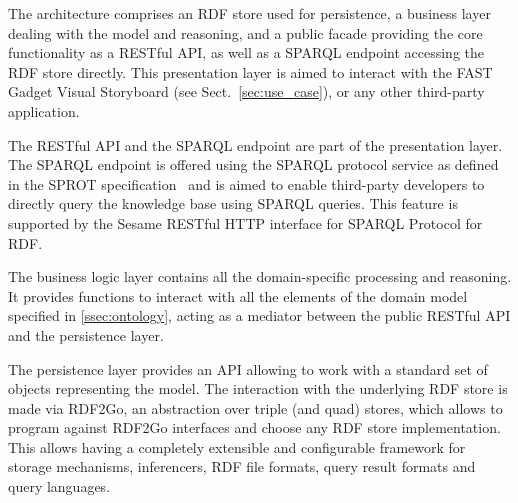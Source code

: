 The architecture comprises an RDF store used for persistence, a business layer dealing with the model and reasoning, and a public facade providing the core functionality as a RESTful API, as well as a SPARQL endpoint accessing the RDF store directly. This presentation layer is aimed to interact with the FAST Gadget Visual Storyboard (see Sect.~\ref{sec:use_case}), or any other third-party application.

The RESTful API and the SPARQL endpoint are part of the presentation layer. The SPARQL endpoint is offered using the SPARQL protocol service as defined in the SPROT specification~\cite{sprot} and is aimed to enable third-party developers to directly query the knowledge base using SPARQL queries. This feature is supported by the Sesame RESTful HTTP interface for SPARQL Protocol for RDF.

The business logic layer contains all the domain-specific processing and reasoning. It provides functions to interact with all the elements of the domain model specified in \ref{ssec:ontology},
acting as a mediator between the public RESTful API and the persistence layer.

The persistence layer provides an API allowing to work with a standard set of objects representing the model. The interaction with the underlying RDF store is made via RDF2Go, an abstraction over triple (and quad) stores, which allows to program against RDF2Go interfaces and choose any RDF store implementation. This allows having a completely extensible and configurable framework for storage mechanisms, inferencers, RDF file formats, query result formats and query languages.




